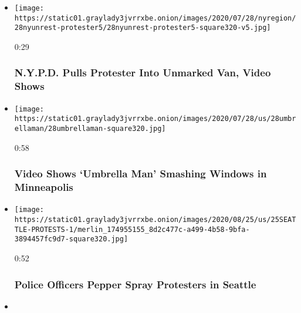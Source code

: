 \begin{itemize}
\item
  \href{https://www.nytimes3xbfgragh.onion/video/us/100000007262950/nypd-unmarked-van.html?action=click\&module=video-series-bar\&region=header\&pgtype=Article\&playlistId=video/minneapolis-george-floyd-death-video}{}

  \texttt{[image: https://static01.graylady3jvrrxbe.onion/images/2020/07/28/nyregion/28nyunrest-protester5/28nyunrest-protester5-square320-v5.jpg]}

  0:29

  \hypertarget{nypd-pulls-protester-into-unmarked-van-video-shows}{%
  \subsubsection{N.Y.P.D. Pulls Protester Into Unmarked Van, Video
  Shows}\label{nypd-pulls-protester-into-unmarked-van-video-shows}}
\item
  \href{https://www.nytimes3xbfgragh.onion/video/us/100000007262407/umbrella-man-minneapolis-video.html?action=click\&module=video-series-bar\&region=header\&pgtype=Article\&playlistId=video/minneapolis-george-floyd-death-video}{}

  \texttt{[image: https://static01.graylady3jvrrxbe.onion/images/2020/07/28/us/28umbrellaman/28umbrellaman-square320.jpg]}

  0:58

  \hypertarget{video-shows-umbrella-man-smashing-windows-in-minneapolis}{%
  \subsubsection{Video Shows `Umbrella Man' Smashing Windows in
  Minneapolis}\label{video-shows-umbrella-man-smashing-windows-in-minneapolis}}
\item
  \href{https://www.nytimes3xbfgragh.onion/video/us/politics/100000007257297/seattle-protest.html?action=click\&module=video-series-bar\&region=header\&pgtype=Article\&playlistId=video/minneapolis-george-floyd-death-video}{}

  \texttt{[image: https://static01.graylady3jvrrxbe.onion/images/2020/08/25/us/25SEATTLE-PROTESTS-1/merlin\_174955155\_8d2c477c-a499-4b58-9bfa-3894457fc9d7-square320.jpg]}

  0:52

  \hypertarget{police-officers-pepper-spray-protesters-in-seattle}{%
  \subsubsection{Police Officers Pepper Spray Protesters in
  Seattle}\label{police-officers-pepper-spray-protesters-in-seattle}}
\item
  \href{https://www.nytimes3xbfgragh.onion/video/us/politics/100000007256689/portland-protest-wall-of-vets.html?action=click\&module=video-series-bar\&region=header\&pgtype=Article\&playlistId=video/minneapolis-george-floyd-death-video}{}


\end{itemize}

